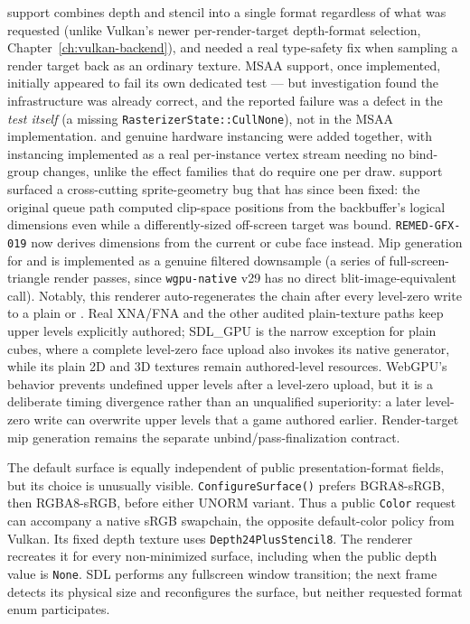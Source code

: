  support combines depth and stencil into a single format regardless
of what was requested (unlike Vulkan's newer per-render-target depth-format selection,
Chapter~\ref{ch:vulkan-backend}),
and needed a real type-safety fix when sampling a render target back as an ordinary texture.
MSAA support, once implemented, initially appeared to fail its own dedicated test --- but
investigation found the infrastructure was already correct, and the reported failure was a
defect in the \emph{test itself} (a missing \texttt{RasterizerState::CullNone}), not in the
MSAA implementation.  and genuine hardware instancing were
added together, with instancing implemented as a real per-instance vertex stream needing no
bind-group changes, unlike the effect families that do require one per draw.
 support surfaced a cross-cutting sprite-geometry bug that has since
been fixed: the original queue path computed clip-space positions from the backbuffer's logical
dimensions even while a differently-sized off-screen target was bound. \texttt{REMED-GFX-019}
now derives dimensions from the current  or cube face instead. Mip
generation for 
and  is implemented as a genuine filtered downsample (a series of
full-screen-triangle render passes, since \texttt{wgpu-native} v29 has no direct
blit-image-equivalent call). Notably, this renderer auto-regenerates the chain after every
level-zero write to a plain  or . Real XNA/FNA and
the other audited plain-texture paths keep upper levels explicitly authored; SDL\_GPU is the
narrow exception for plain cubes, where a complete level-zero face upload also invokes its
native generator, while its plain 2D and 3D textures remain authored-level resources.
WebGPU's behavior prevents undefined upper levels after a level-zero upload, but it is a
deliberate timing divergence rather than an unqualified superiority: a later level-zero write
can overwrite upper levels that a game authored earlier. Render-target mip generation remains
the separate unbind/pass-finalization contract.

\begin{sourcenote}
The default surface is equally independent of public presentation-format fields, but its
choice is unusually visible. \texttt{ConfigureSurface()} prefers BGRA8-sRGB, then
RGBA8-sRGB, before either UNORM variant. Thus a public \texttt{Color} request can accompany
a native sRGB swapchain, the opposite default-color policy from Vulkan. Its fixed depth
texture uses \texttt{Depth24PlusStencil8}. The renderer recreates it for every non-minimized
surface, including when the public depth value is \texttt{None}. SDL performs any fullscreen window transition;
the next frame detects its physical size and reconfigures the surface, but neither requested
format enum participates.
\end{sourcenote}

